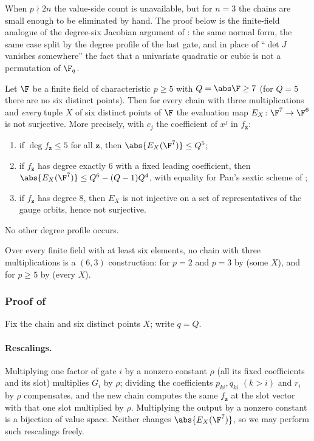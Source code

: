 When $p\nmid 2n$ the value-side count is unavailable, but for $n=3$ the chains are small
enough to be eliminated by hand.  The proof below is the finite-field analogue of the
degree-six Jacobian argument of : the same normal form, the same case
split by the degree profile of the last gate, and in place of ``$\det J$ vanishes
somewhere'' the fact that a univariate quadratic or cubic is not a permutation of $\F_q$.

\begin{theorem}
\label{thm:charp-n3}
Let $\F$ be a finite field of characteristic $p\ge5$ with $Q=\abs\F\ge7$ (for $Q=5$ there
are no six distinct points).  Then for every chain with three multiplications and
\emph{every} tuple $X$ of six distinct points of $\F$ the evaluation map
$E_X\colon\F^7\to\F^6$ is not surjective.  More precisely, with $c_j$ the coefficient of
$x^j$ in $f_{\mathbf z}$:
\begin{enumerate}
\item[(a)] if $\deg f_{\mathbf z}\le5$ for all $\mathbf z$, then $\abs{E_X(\F^7)}\le Q^5$;
\item[(b)] if $f_{\mathbf z}$ has degree exactly $6$ with a fixed leading coefficient, then
   $\abs{E_X(\F^7)}\le Q^6-(Q-1)Q^4$, with equality for Pan's sextic scheme of
   ;
\item[(c)] if $f_{\mathbf z}$ has degree $8$, then $E_X$ is not injective on a set of
   representatives of the gauge orbits, hence not surjective.
\end{enumerate}
No other degree profile occurs.
\end{theorem}

\begin{corollary}
\label{cor:charp-n3-all}
Over every finite field with at least six elements, no chain with three multiplications
is a $(6,3)$ construction: for $p=2$ and $p=3$ by 
(some $X$), and for $p\ge5$ by  (every $X$).
\end{corollary}

\subsubsection*{Proof of }

Fix the chain and six distinct points $X$; write $q=Q$.

\paragraph{Rescalings.}
Multiplying one factor of gate $i$ by a nonzero constant $\rho$ (all its fixed coefficients
and its slot) multiplies $G_i$ by $\rho$; dividing the coefficients $p_{ki},q_{ki}$ $(k>i)$
and $r_i$ by $\rho$ compensates, and the new chain computes the same $f_{\mathbf z}$ at
the slot vector with that one slot multiplied by $\rho$.  Multiplying the output by a
nonzero constant is a bijection of value space.  Neither changes $\abs{E_X(\F^7)}$, so we
may perform such rescalings freely.

